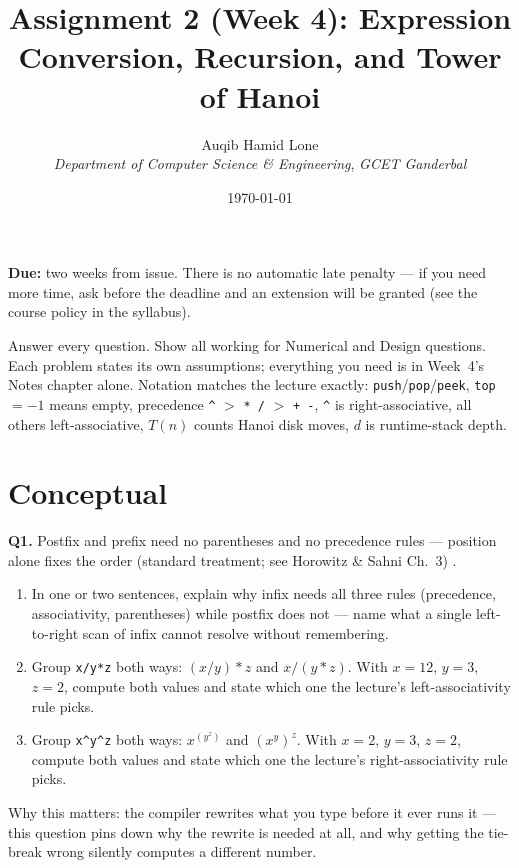 \documentclass[11pt]{article}
\title{Assignment 2 (Week 4): Expression Conversion, Recursion, and Tower of Hanoi}
\author{Auqib Hamid Lone\\[0.3em]
  \emph{Department of Computer Science \& Engineering}, \emph{GCET Ganderbal}}
\date{\today}
\begin{document}
\maketitle

\noindent\textbf{Due:} two weeks from issue. There is no automatic late penalty --- if you need more time, ask before the deadline and an extension will be granted (see the course policy in the syllabus).

\noindent Answer every question. Show all working for Numerical and Design questions. Each problem states its own assumptions; everything you need is in Week~4's Notes chapter alone. Notation matches the lecture exactly: \texttt{push}/\texttt{pop}/\texttt{peek}, \texttt{top} $= -1$ means empty, precedence \texttt{\^{}} $>$ \texttt{* /} $>$ \texttt{+ -}, \texttt{\^{}} is right-associative, all others left-associative, $T(n)$ counts Hanoi disk moves, $d$ is runtime-stack depth.

\section{Conceptual}

\textbf{Q1.} Postfix and prefix need no parentheses and no precedence rules --- position alone fixes the order (standard treatment; see Horowitz \& Sahni Ch.~3) \cite{HorowitzSahni2008_fundamentals_data_structures}.
\begin{enumerate}
  \item[(a)] In one or two sentences, explain why infix needs all three rules (precedence, associativity, parentheses) while postfix does not --- name what a single left-to-right scan of infix cannot resolve without remembering.
  \item[(b)] Group \texttt{x/y*z} both ways: $(x/y)*z$ and $x/(y*z)$. With $x = 12$, $y = 3$, $z = 2$, compute both values and state which one the lecture's left-associativity rule picks.
  \item[(c)] Group \texttt{x\^{}y\^{}z} both ways: $x^{(y^{z})}$ and $(x^{y})^{z}$. With $x = 2$, $y = 3$, $z = 2$, compute both values and state which one the lecture's right-associativity rule picks.
\end{enumerate}
Why this matters: the compiler rewrites what you type before it ever runs it --- this question pins down why the rewrite is needed at all, and why getting the tie-break wrong silently computes a different number.
\end{document}

